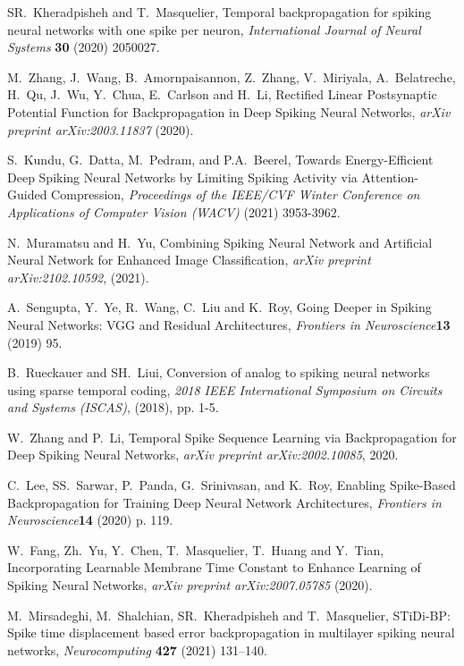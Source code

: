 \documentclass[preprint,twocolumn,5p,12pt]{article}
\begin{document}
\begin{singlespace}
\begin{thebibliography}{10}
SR.~Kheradpisheh and T.~Masquelier, Temporal backpropagation for spiking neural networks with one spike per neuron, {\em International Journal of Neural Systems} {\bf 30}  (2020) 2050027.

M.~Zhang, J.~Wang, B.~Amornpaisannon, Z.~Zhang, V.~Miriyala, A.~Belatreche, H.~Qu, J.~Wu, Y.~Chua, E.~Carlson and H.~Li, Rectified Linear Postsynaptic Potential Function for Backpropagation in Deep Spiking Neural Networks, {\em arXiv preprint arXiv:2003.11837}  (2020).

S.~Kundu, G.~Datta, M.~Pedram, and P.A.~Beerel, Towards Energy-Efficient Deep Spiking Neural Networks by Limiting Spiking Activity via Attention-Guided Compression, {\em Proceedings of the IEEE/CVF Winter Conference on Applications of Computer Vision (WACV)}   (2021)  3953-3962.

N.~Muramatsu and H.~Yu, Combining Spiking Neural Network and Artificial Neural Network for Enhanced Image Classification, {\em arXiv preprint arXiv:2102.10592}, (2021).

A.~Sengupta, Y.~Ye, R.~Wang, C.~Liu and K.~Roy, Going Deeper in Spiking Neural Networks: VGG and Residual Architectures, {\em Frontiers in Neuroscience}{\bf 13}   (2019) 95.

B.~Rueckauer and SH.~Liui,  Conversion of analog to spiking neural networks using sparse temporal coding, {\em 2018 IEEE International Symposium on Circuits and Systems (ISCAS)},  (2018), pp. 1-5.

W.~Zhang and P.~Li, Temporal Spike Sequence Learning via Backpropagation for Deep Spiking Neural Networks, {\em arXiv preprint arXiv:2002.10085}, 2020.

C.~Lee, SS.~Sarwar, P.~Panda, G.~Srinivasan, and K.~Roy, Enabling Spike-Based Backpropagation for Training Deep Neural Network Architectures, {\em Frontiers in Neuroscience}{\bf 14}   (2020)   p. 119.

W.~Fang, Zh.~Yu, Y.~Chen, T.~Masquelier, T.~Huang and Y.~Tian,
 Incorporating Learnable Membrane Time Constant to Enhance Learning of Spiking Neural Networks, {\em arXiv preprint arXiv:2007.05785}  (2020).

M.~Mirsadeghi, M.~Shalchian, SR.~Kheradpisheh and T.~Masquelier,
  STiDi-BP: Spike time displacement based error backpropagation in multilayer spiking neural networks,
  {\em Neurocomputing} {\bf 427}   (2021)
  131--140.


\end{thebibliography}
\end{singlespace}
\end{document}

